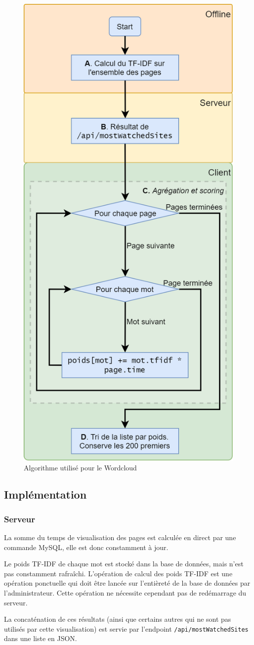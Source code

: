 			\begin{figure}[!h]
				\centering
				\includegraphics[height=1\textwidth]{images/design/pages/wordcloud_algo}
				\caption{Algorithme utilisé pour le Wordcloud}
				\label{wordcloud_algo}
			\end{figure}

	\subsection{Implémentation}

		\subsubsection{Serveur}

			La somme du temps de visualisation des pages est calculée en direct par une commande MySQL, elle est donc constamment à jour.

			Le poids TF-IDF de chaque mot est stocké dans la base de données, mais n'est pas constamment rafraîchi. L'opération de calcul des poids TF-IDF est une opération ponctuelle qui doit être lancée sur l'entièreté de la base de données par l'administrateur. Cette opération ne nécessite cependant pas de redémarrage du serveur.

			La concaténation de ces résultats (ainsi que certains autres qui ne sont pas utilisés par cette visualisation) est servie par l'endpoint \texttt{/api/mostWatchedSites} dans une liste en JSON.

